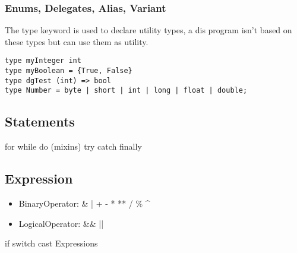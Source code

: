 \subsubsection*{Enums, Delegates, Alias, Variant}
The type keyword is used to declare utility types, a dis program isn't based on these types but can use them as utility.

\begin{lstlisting}
type myInteger int
type myBoolean = {True, False}
type dgTest (int) => bool
type Number = byte | short | int | long | float | double;
\end{lstlisting}


\subsection{Statements}
for while do (mixins) try catch finally

\subsection{Expression}
\begin{itemize}
\item BinaryOperator: \& | + - * ** / \% \textasciicircum{} 
\item LogicalOperator: \&\&  ||
\end{itemize}
if 
switch
cast Expressions
